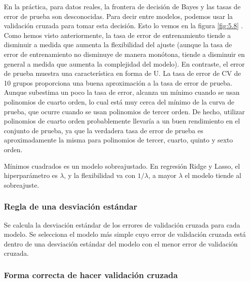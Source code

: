 En la práctica, para datos reales, la frontera de decisión de Bayes y las tasas de error de prueba son desconocidas. Para decir entre modelos, podemos usar la validación cruzada para tomar esta decisión. Esto lo vemos en la figura \ref{fig:5.8} . Como hemos visto anteriormente, la tasa de error de entrenamiento tiende a disminuir a medida que aumenta la flexibilidad del ajuste (aunque la tasa de error de entrenamiento no disminuye de manera monótona, tiende a disminuir en general a medida que aumenta la complejidad del modelo). En contraste, el error de prueba muestra una característica en forma de U. La tasa de error de CV de 10 grupos proporciona una buena aproximación a la tasa de error de prueba. Aunque subestima un poco la tasa de error, alcanza un mínimo cuando se usan polinomios de cuarto orden, lo cual está muy cerca del mínimo de la curva de prueba, que ocurre cuando se usan polinomios de tercer orden. De hecho, utilizar polinomios de cuarto orden probablemente llevaría a un buen rendimiento en el conjunto de prueba, ya que la verdadera tasa de error de prueba es aproximadamente la misma para polinomios de tercer, cuarto, quinto y sexto orden. 

\begin{example}
Mínimos cuadrados es un modelo sobreajustado. En regresión Ridge y Lasso, el hiperparámetro es $\lambda$, y la flexibilidad va con $1/\lambda$, a mayor $\lambda$ el modelo tiende al sobreajuste. 
\end{example}

\subsubsection{Regla de una desviación estándar}

Se calcula la desviación estándar de los errores de validación cruzada para cada modelo. Se selecciona el modelo más simple cuyo error de validación cruzada está dentro de una desviación estándar del modelo con el menor error de validación cruzada.

\subsubsection{Forma correcta de hacer validación cruzada}


